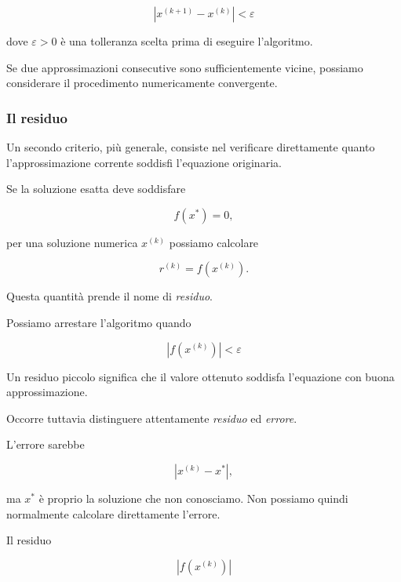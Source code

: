 \begin{equation*}
    |x^{(k+1)}-x^{(k)}|<\varepsilon
\label{eq:stopping-iterates}
\end{equation*}

dove $\varepsilon>0$ è una tolleranza scelta prima di eseguire
l'algoritmo.

Se due approssimazioni consecutive sono sufficientemente vicine,
possiamo considerare il procedimento numericamente convergente.


\subsubsection{Il residuo}

Un secondo criterio, più generale, consiste nel verificare
direttamente quanto l'approssimazione corrente soddisfi l'equazione
originaria.

Se la soluzione esatta deve soddisfare

\begin{equation*}
    f(x^*)=0,
\end{equation*}

per una soluzione numerica $x^{(k)}$ possiamo calcolare

\begin{equation*}
    r^{(k)}=f(x^{(k)}).
\end{equation*}

Questa quantità prende il nome di \emph{residuo}.

Possiamo arrestare l'algoritmo quando

\begin{equation*}
    |f(x^{(k)})|<\varepsilon
\label{eq:stopping-residual}
\end{equation*}

Un residuo piccolo significa che il valore ottenuto soddisfa
l'equazione con buona approssimazione.

Occorre tuttavia distinguere attentamente \emph{residuo} ed
\emph{errore}.

L'errore sarebbe

\begin{equation*}
    |x^{(k)}-x^*|,
\end{equation*}

ma $x^*$ è proprio la soluzione che non conosciamo. Non possiamo
quindi normalmente calcolare direttamente l'errore.

Il residuo

\begin{equation*}
    |f(x^{(k)})|
\end{equation*}

